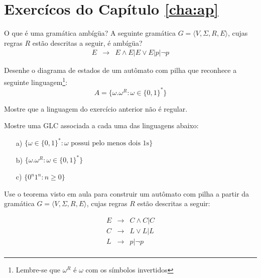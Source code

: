 \section{Exercícos do Capítulo \ref{cha:ap}}
\label{sec:ex-ap}

\begin{exercicio}
  O que é uma gramática ambígüa? A seguinte gramática $G = \langle V, \Sigma, R, E \rangle$, cujas regras $R$ estão descritas a seguir, é ambígüa?
  \begin{eqnarray*}
    E & \rightarrow & E \land E | E \lor E | p | \neg p
  \end{eqnarray*}
\end{exercicio}


\begin{exercicio}
Desenhe o diagrama de estados de um autômato com pilha que reconhece a seguinte linguagem\footnote{Lembre-se que $\omega^R$ é $\omega$ com os símbolos invertidos}:
\begin{displaymath}
  A = \{\omega.\omega^R : \omega \in \{0,1\}^* \}
\end{displaymath}
\end{exercicio}



\begin{exercicio}
  Mostre que a linguagem do exercício anterior não é regular.
\end{exercicio}


\begin{exercicio}
  Mostre uma GLC associada a cada uma das linguagens abaixo:
  \begin{enumerate}
  \item[a)] $\{\omega \in \{0,1\}^* : \omega \textrm{ possui pelo menos dois 1s} \}$
  \item[b)] $\{\omega.\omega^R : \omega \in \{0,1\}^*\}$
  \item[c)] $\{0^n1^n: n \geq 0\}$
  \end{enumerate}
\end{exercicio}

\begin{exercicio}
  Use o teorema visto em aula para construir um autômato com pilha a partir da gramática $G = \langle V, \Sigma, R, E \rangle$, cujas regras $R$ estão descritas a seguir:

  \begin{eqnarray*}
    E & \rightarrow & C \land C | C\\
    C & \rightarrow & L \lor L | L\\
    L & \rightarrow & p | \neg p\\
  \end{eqnarray*}
\end{exercicio}

